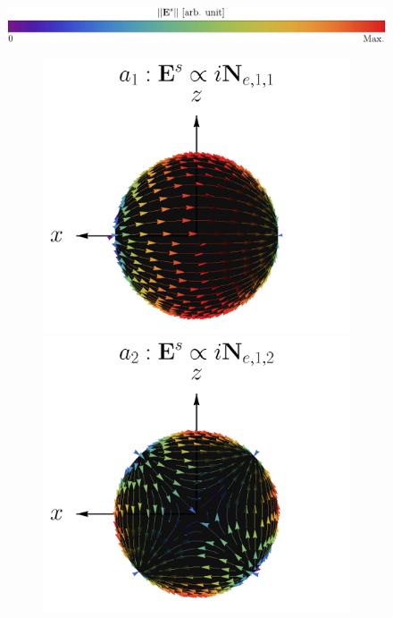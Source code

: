 	\begin{figure}[h!]\centering
		\includegraphics[scale=.85]{1-Teoria/figs/EsNorm.pdf}\\
		\hspace{-4em}
		\begin{subfigure}{.05\linewidth}\vspace{-3.25cm}\label{figs:ElectricMultipoles} \caption{ } \end{subfigure}
		\hspace{-3em}
		\begin{subfigure}{.9\linewidth}
			\includegraphics[scale=.25]{1-Teoria/figs/Ne11_static_crop.png}%
			\includegraphics[scale=.25]{1-Teoria/figs/Ne12_static_crop.png}%

\end{subfigure}
\end{figure}
